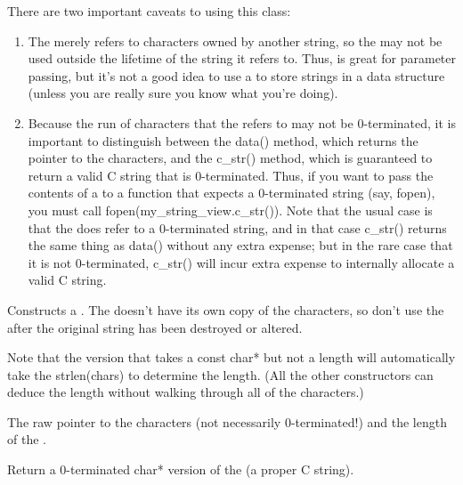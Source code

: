 There are two important caveats to using this class:
\begin{enumerate}
\item The \stringview merely refers to characters owned by another string,
   so the \stringview may not be used outside the lifetime of the string
   it refers to. Thus, \stringview is great for parameter passing, but
   it's not a good idea to use a \stringview to store strings in a data
   structure (unless you are really sure you know what you're doing).
\item Because the run of characters that the \stringview refers to may not
   be 0-terminated, it is important to distinguish between the {\cf data()}
   method, which returns the pointer to the characters, and the {\cf c_str()}
   method, which is guaranteed to return a valid C string that is
   0-terminated. Thus, if you want to pass the contents of a \stringview
   to a function that expects a 0-terminated string (say, fopen), you
   must call {\cf fopen(my_string_view.c_str()}).  Note that the usual case
   is that the \stringview does refer to a 0-terminated string, and in
   that case c_str() returns the same thing as data() without any extra
   expense; but in the rare case that it is not 0-terminated, c_str()
   will incur extra expense to internally allocate a valid C string.
\end{enumerate}

Constructs a \stringview.  The \stringview doesn't have its own copy of the
characters, so don't use the \stringview after the original string has been
destroyed or altered.

Note that the version that takes a {\cf const char*} but not a length will
automatically take the {\cf strlen(chars)} to determine the length.  (All
the other constructors can deduce the length without walking through all
of the characters.)
\apiend

The raw pointer to the characters (not necessarily 0-terminated!)
and the length of the \stringview.
\apiend

Return a 0-terminated {\cf char*} version of the \stringview (a proper C
string).
\apiend

